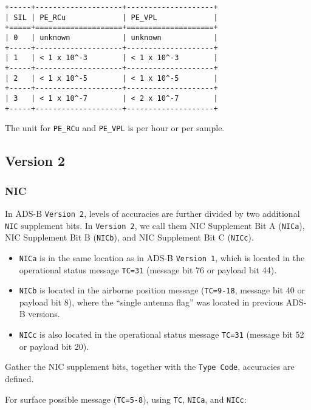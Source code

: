 \begin{verbatim}
+-----+--------------------+--------------------+
| SIL | PE_RCu             | PE_VPL             |
+=====+====================+====================+
| 0   | unknown            | unknown            |
+-----+--------------------+--------------------+
| 1   | < 1 x 10^-3        | < 1 x 10^-3        |
+-----+--------------------+--------------------+
| 2   | < 1 x 10^-5        | < 1 x 10^-5        |
+-----+--------------------+--------------------+
| 3   | < 1 x 10^-7        | < 2 x 10^-7        |
+-----+--------------------+--------------------+
\end{verbatim}

The unit for \texttt{PE\_RCu} and \texttt{PE\_VPL} is per hour or per
sample.

\subsection{Version 2}\label{version-2}

\subsubsection{NIC}\label{nic-1}

In ADS-B \texttt{Version\ 2}, levels of accuracies are further divided
by two additional \texttt{NIC} supplement bits. In \texttt{Version\ 2}, we
call them NIC Supplement Bit A (\texttt{NICa}), NIC Supplement Bit B
(\texttt{NICb}), and NIC Supplement Bit C (\texttt{NICc}).

\begin{itemize}

\item
  \texttt{NICa} is in the same location as in ADS-B \texttt{Version\ 1},
  which is located in the operational status message \texttt{TC=31}
  (message bit 76 or payload bit 44).
\item
  \texttt{NICb} is located in the airborne position message
  (\texttt{TC=9-18}, message bit 40 or payload bit 8), where the
  ``single antenna flag'' was located in previous ADS-B versions.
\item
  \texttt{NICc} is also located in the operational status message
  \texttt{TC=31} (message bit 52 or payload bit 20).
\end{itemize}

Gather the NIC supplement bits, together with the \texttt{Type\ Code},
accuracies are defined.

For surface possible message (\texttt{TC=5-8}), using \texttt{TC},
\texttt{NICa}, and \texttt{NICc}:

